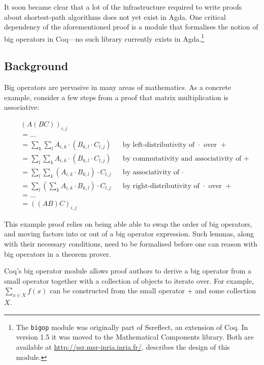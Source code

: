 \documentclass[a4paper]{scrartcl}
\begin{document}
It soon became clear that a lot of the infrastructure required to write proofs about shortest-path algorithms does not yet exist in Agda.
One critical dependency of the aforementioned proof is a module that formalises the notion of big operators in Coq---no such library currently exists in Agda.\footnote{The \texttt{bigop} module was originally part of Ssreflect, an extension of Coq. In version 1.5 it was moved to the Mathematical Components library. Both are available at \url{http://ssr.msr-inria.inria.fr/}. \autocite{bertot_canonical_2008} describes the design of this module.}

\subsection{Background}

Big operators are pervasive in many areas of mathematics. As a concrete example, consider a few steps from a proof that matrix multiplication is associative:

\begin{align*}
&\left(A \left(B C\right)\right)_{i,j} \\
&= \dots \\
&= \sum_k \sum_l  A_{i,k} \cdot \left( B_{k,l} \cdot C_{l,j} \right)
  && \text{by left-distributivity of \(\cdot\) over \(+\)} \\
&= \sum_l \sum_k  A_{i,k} \cdot \left( B_{k,l} \cdot C_{l,j} \right)
  && \text{by commutativity and associativity of \(+\)} \\
&= \sum_l \sum_k \left( A_{i,k} \cdot B_{k,l} \right) \cdot C_{l,j}
  && \text{by associativity of \(\cdot\)} \\
&= \sum_l \left( \sum_k A_{i,k} \cdot B_{k,l} \right) \cdot C_{l,j}
  && \text{by right-distributivity of \(\cdot\) over \(+\)} \\
&= \dots \\
&= \left( \left( A  B \right) C\right)_{i,j}
\end{align*}

This example proof relies on being able able to swap the order of big operators, and moving factors into or out of a big operator expression. Such lemmas, along with their necessary conditions, need to be formalised before one can reason with big operators in a theorem prover.

Coq's big operator module allows proof authors to derive a big operator from a small operator together with a collection of objects to iterate over. For example, \(\sum_{x \in X} f(x)\) can be constructed from the small operator \(+\) and some collection \(X\).
\end{document}
